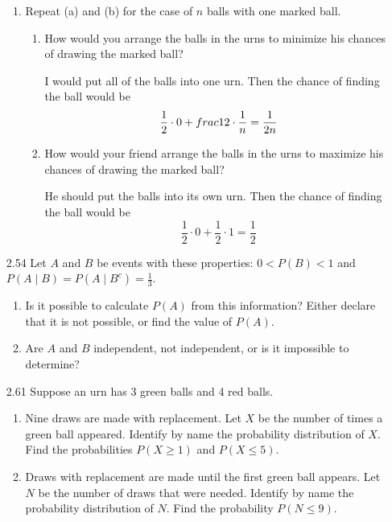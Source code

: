 \documentclass[10pt]{article}
\begin{document}
\begin{itemize}
\begin{enumerate}
      \item Repeat (a) and (b) for the case of $n$ balls with one marked ball.
        \begin{enumerate}
          \item How would you arrange the balls in the urns to minimize
            his chances of drawing the marked ball?

            I would put all of the balls into one urn.  Then the chance of
            finding the ball would be
            \[ \frac{1}{2} \cdot 0 + \\frac{1}{2} \cdot \frac{1}{n} = \frac{1}{2n}  \]

          \item How would your friend arrange the balls in the urns to
            maximize his chances of drawing the marked ball?

            He should put the balls into its own urn.  Then the chance of
            finding the ball would be
            \[ \frac{1}{2} \cdot 0 + \frac{1}{2} \cdot 1 = \frac{1}{2}  \]
        \end{enumerate}

    \end{enumerate}


\newpage
  \item[2.54] Let $A$ and $B$ be events with these properties: $0<P(B)<1$
    and $P(A \mid B)=P\left(A \mid B^{c}\right)=\frac{1}{3}$.
    \begin{enumerate}
      \item Is it possible to calculate $P(A)$ from this information?
        Either declare that it is not possible, or find the value of
        $P(A)$.

      \item Are $A$ and $B$ independent, not independent, or is it
        impossible to determine?

    \end{enumerate}

\newpage
  \item[2.61] Suppose an urn has 3 green balls and 4 red balls.
    \begin{enumerate}
      \item Nine draws are made with replacement. Let $X$ be the number
        of times a green ball appeared. Identify by name the probability
        distribution of $X$. Find the probabilities $P(X \geq 1)$ and
        $P(X \leq 5)$.

      \item Draws with replacement are made until the first green ball
        appears. Let $N$ be the number of draws that were needed.
        Identify by name the probability distribution of $N$. Find the
        probability $P(N \leq 9)$.


\end{enumerate}
\end{itemize}
\end{document}
